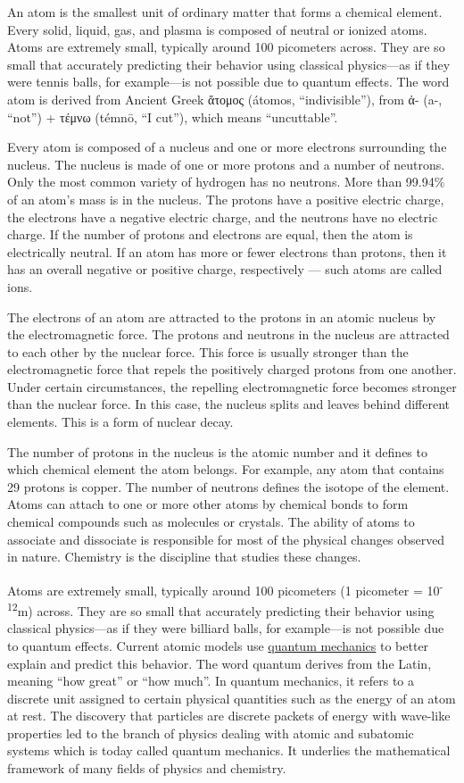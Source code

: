 An atom is the smallest unit of ordinary matter that forms a chemical
element. Every solid, liquid, gas, and plasma is composed of neutral or
ionized atoms. Atoms are extremely small, typically around 100
picometers across. They are so small that accurately predicting their
behavior using classical physics---as if they were tennis balls, for
example---is not possible due to quantum effects. The word atom is
derived from Ancient Greek ἄτομος (átomos, ``indivisible''), from ἀ-
(a-, ``not'') + τέμνω (témnō, ``I cut''), which means ``uncuttable''.

Every atom is composed of a nucleus and one or more electrons
surrounding the nucleus. The nucleus is made of one or more protons and
a number of neutrons. Only the most common variety of hydrogen has no
neutrons. More than 99.94\% of an atom's mass is in the nucleus. The
protons have a positive electric charge, the electrons have a negative
electric charge, and the neutrons have no electric charge. If the number
of protons and electrons are equal, then the atom is electrically
neutral. If an atom has more or fewer electrons than protons, then it
has an overall negative or positive charge, respectively --- such atoms
are called ions.

The electrons of an atom are attracted to the protons in an atomic
nucleus by the electromagnetic force. The protons and neutrons in the
nucleus are attracted to each other by the nuclear force. This force is
usually stronger than the electromagnetic force that repels the
positively charged protons from one another. Under certain
circumstances, the repelling electromagnetic force becomes stronger than
the nuclear force. In this case, the nucleus splits and leaves behind
different elements. This is a form of nuclear decay.

The number of protons in the nucleus is the atomic number and it defines
to which chemical element the atom belongs. For example, any atom that
contains 29 protons is copper. The number of neutrons defines the
isotope of the element. Atoms can attach to one or more other atoms by
chemical bonds to form chemical compounds such as molecules or crystals.
The ability of atoms to associate and dissociate is responsible for most
of the physical changes observed in nature. Chemistry is the discipline
that studies these changes.

Atoms are extremely small, typically around 100 picometers (1 picometer
= 10\textsuperscript{-12}m) across. They are so small that accurately
predicting their behavior using classical physics---as if they were
billiard balls, for example---is not possible due to quantum effects.
Current atomic models use
\href{https://en.wikipedia.org/wiki/Quantum_mechanics}{quantum
mechanics} to better explain and predict this behavior. The word quantum
derives from the Latin, meaning ``how great'' or ``how much''. In
quantum mechanics, it refers to a discrete unit assigned to certain
physical quantities such as the energy of an atom at rest. The discovery
that particles are discrete packets of energy with wave-like properties
led to the branch of physics dealing with atomic and subatomic systems
which is today called quantum mechanics. It underlies the mathematical
framework of many fields of physics and chemistry.

